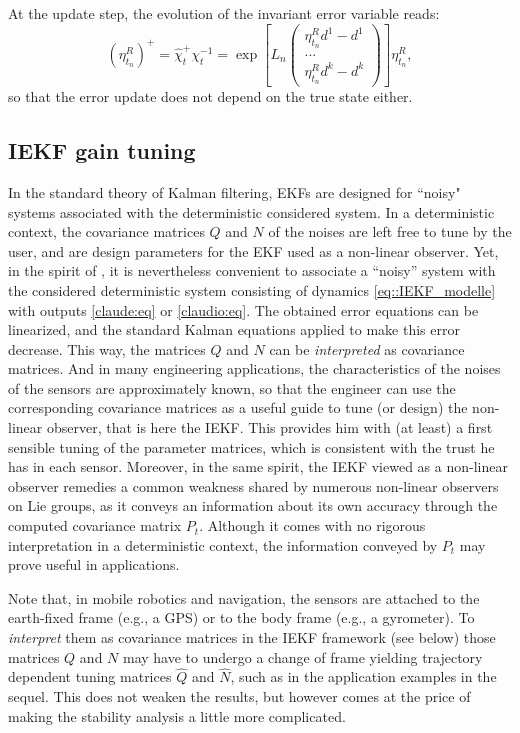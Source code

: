\documentclass[a4paper,12pt,onecolumn]{article}
\begin{document}
  
At the update step, the evolution of the invariant error variable reads:
\[
(\eta_{t_n}^R)^+ =\hat{\chi}_t^+ \chi_t^{-1}
= \exp \left[ L_n
\begin{pmatrix}
\eta_{t_n}^R d^1 -  d^1 \\
... \\
\eta_{t_n}^R d^k -  d^k
\end{pmatrix} \right] \eta_{t_n}^R,
\]
so that the error update does not depend on the true state either. 


\subsection{IEKF gain tuning}\label{ouida}


In the standard theory of Kalman filtering, EKFs are designed for ``noisy" systems associated with the deterministic considered system. In a deterministic context, the covariance matrices $Q$ and $N$ of the noises are left free to tune by the user, and are design parameters for the EKF used as  a non-linear observer. Yet, in the spirit of \cite{song-grizzle-95}, it is nevertheless convenient to  associate a ``noisy'' system with the considered deterministic system consisting of dynamics \eqref{eq::IEKF_modelle} with outputs \eqref{claude:eq} or \eqref{claudio:eq}. The obtained error equations can be linearized, and the standard Kalman equations applied to make this error decrease. This way, the matrices $Q$ and $N$  can be \emph{interpreted} as covariance matrices. And in many engineering applications, the characteristics of the noises of the sensors are approximately known, so that the engineer can use the corresponding covariance matrices as a useful guide to tune (or design) the  non-linear observer, that is here the IEKF. This provides him with (at least) a first sensible tuning  of the parameter matrices, which is consistent with the trust he has in each sensor. Moreover,  in the same spirit, the IEKF viewed as a non-linear observer remedies a common weakness shared by numerous non-linear observers on Lie groups, as it conveys an information about its own accuracy through the computed covariance matrix $P_t$. Although it comes with no rigorous interpretation in a deterministic context, the information conveyed by $P_t$ may prove useful in applications. 


Note that,  in mobile robotics and navigation, the sensors are attached to the earth-fixed frame (e.g., a GPS) or to the body frame (e.g., a gyrometer). To \emph{interpret} them as covariance matrices in the IEKF framework (see below) those matrices $Q$ and $N$ may have to undergo a change of frame yielding trajectory dependent tuning matrices $\hat Q$ and $\hat N$, such as in the application examples in the sequel. This does not weaken the results, but however comes at the price of making the stability analysis a little more complicated. 
\end{document}
